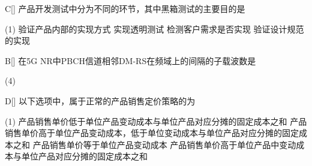 \begin{choice}{C}[]
    产品开发测试中分为不同的环节，其中黑箱测试的主要目的是
    \begin{tasks}(1)
        \task 验证产品内部的实现方式
        \task 实现透明测试
        \task 检测客户需求是否实现
        \task 验证设计规范的实现
    \end{tasks}
\end{choice}


\begin{choice}{B}[]
    在5G NR中PBCH信道相邻DM-RS在频域上的间隔的子载波数是
    \begin{tasks}(4)
    \end{tasks}
\end{choice}


\begin{choice}{D}[]
    以下选项中，属于正常的产品销售定价策略的为
    \begin{tasks}(1)
        \task 产品销售单价低于单位产品变动成本与单位产品对应分摊的固定成本之和
        \task 产品销售单价高于单位产品变动成本，低于单位变动成本与单位产品对应分摊的固定成本之和
        \task 产品销售单价等于单位产品变动成本
        \task 产品销售单价高于单位产品中变动成本与单位产品对应分摊的固定成本之和
    \end{tasks}
\end{choice}

